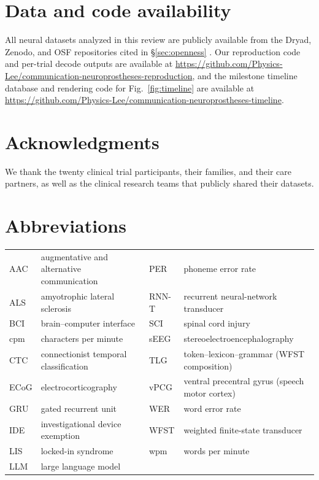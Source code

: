\documentclass[11pt]{article}
\begin{document}
\clearpage
\section*{Data and code availability}

{\setlength{\leftskip}{1.2pt}\setlength{\rightskip}{1.2pt}\relax
All neural datasets analyzed in this review are publicly available from
the Dryad, Zenodo, and OSF repositories cited in \S\ref{sec:openness}
\cite{card2024, willett2023, wairagkar2025, jude2026lis, jude2026typing, willett2021, fan2023, kunz2025, btot}. Our reproduction code and per-trial
decode outputs are available at
\url{https://github.com/Physics-Lee/communication-neuroprostheses-reproduction},
and the milestone timeline database and rendering code for
Fig.~\ref{fig:timeline} are available at
\url{https://github.com/Physics-Lee/communication-neuroprostheses-timeline}.\par}

\section*{Acknowledgments}

We thank the twenty clinical trial participants, their families, and
their care partners, as well as the clinical research teams that
publicly shared their datasets.

\section*{Abbreviations}

\noindent
\begin{tabular}{@{}>{\raggedright\arraybackslash}p{1.6cm}>{\raggedright\arraybackslash}p{5.6cm}>{\raggedright\arraybackslash}p{1.6cm}>{\raggedright\arraybackslash}p{5.6cm}@{}}
AAC & augmentative and alternative communication & PER & phoneme error rate \\
ALS & amyotrophic lateral sclerosis & RNN-T & recurrent neural-network transducer \\
BCI & brain--computer interface & SCI & spinal cord injury \\
cpm & characters per minute & sEEG & stereoelectroencephalography \\
CTC & connectionist temporal classification & TLG & token--lexicon--grammar (WFST composition) \\
ECoG & electrocorticography & vPCG & ventral precentral gyrus (speech motor cortex) \\
GRU & gated recurrent unit & WER & word error rate \\
IDE & investigational device exemption & WFST & weighted finite-state transducer \\
LIS & locked-in syndrome & wpm & words per minute \\
LLM & large language model & & \\
\end{tabular}
\end{document}
